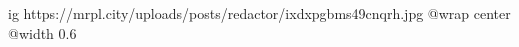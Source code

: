  
 
 
 
 

\ifcmt
  ig https://mrpl.city/uploads/posts/redactor/ixdxpgbms49cnqrh.jpg
  @wrap center
  @width 0.6
\fi
